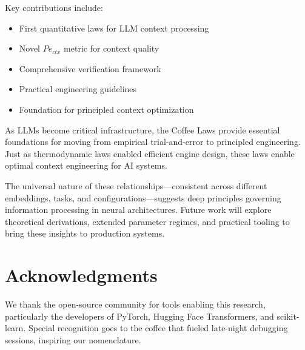 \documentclass[conference]{IEEEtran}
\begin{document}
Key contributions include:
\begin{itemize}
\item First quantitative laws for LLM context processing
\item Novel $Pe_{ctx}$ metric for context quality
\item Comprehensive verification framework
\item Practical engineering guidelines
\item Foundation for principled context optimization
\end{itemize}

As LLMs become critical infrastructure, the Coffee Laws provide essential foundations for moving from empirical trial-and-error to principled engineering. Just as thermodynamic laws enabled efficient engine design, these laws enable optimal context engineering for AI systems.

The universal nature of these relationships—consistent across different embeddings, tasks, and configurations—suggests deep principles governing information processing in neural architectures. Future work will explore theoretical derivations, extended parameter regimes, and practical tooling to bring these insights to production systems.

\section*{Acknowledgments}

We thank the open-source community for tools enabling this research, particularly the developers of PyTorch, Hugging Face Transformers, and scikit-learn. Special recognition goes to the coffee that fueled late-night debugging sessions, inspiring our nomenclature.
\end{document}

